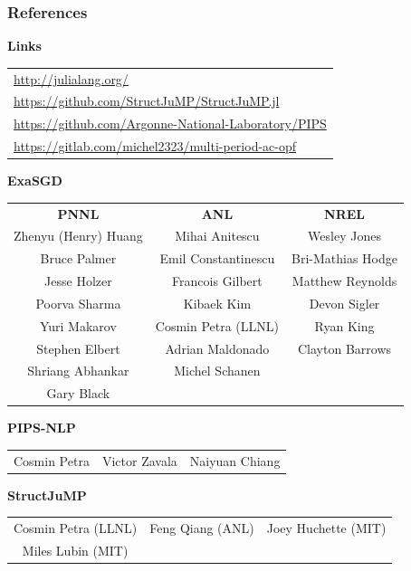 \begin{frame}
  \frametitle{References}
  \footnotesize
  {\bf Links}\\
  \begin{tabular}{l}
  \href{http://julialang.org/}{http://julialang.org/} \\
  \href{https://github.com/StructJuMP/StructJuMP.jl}{https://github.com/StructJuMP/StructJuMP.jl}
  \\
  \href{https://github.com/Argonne-National-Laboratory/PIPS}{https://github.com/Argonne-National-Laboratory/PIPS}\\
  \href{https://gitlab.com/michel2323/multi-period-ac-opf}{https://gitlab.com/michel2323/multi-period-ac-opf}\\
  \end{tabular}


  {\bf ExaSGD}
  \begin{center}
    \begin{tabular}{ccc}
      {\bf PNNL} & {\bf ANL} & {\bf NREL} \\
      Zhenyu (Henry) Huang & Mihai Anitescu & Wesley Jones \\
      Bruce Palmer & Emil Constantinescu & Bri-Mathias Hodge \\
      Jesse Holzer&  Francois Gilbert & Matthew Reynolds\\
      Poorva Sharma & Kibaek Kim & Devon Sigler \\
      Yuri Makarov &  Cosmin Petra  (LLNL)  & Ryan King\\
      Stephen Elbert  &Adrian Maldonado& Clayton Barrows \\
      Shriang Abhankar &  Michel Schanen \\
      Gary Black \\
    \end{tabular}
  \end{center}
  {\bf PIPS-NLP}
  \begin{center}
    \begin{tabular}{ccc}
      Cosmin Petra & Victor Zavala & Naiyuan Chiang \\
    \end{tabular}
  \end{center}
  {\bf StructJuMP}\\
  \begin{center}
    \begin{tabular}{ccc}
      Cosmin Petra (LLNL) & Feng Qiang (ANL) & Joey Huchette (MIT)\\
      Miles Lubin (MIT)\\
    \end{tabular}
  \end{center}
\end{frame}




